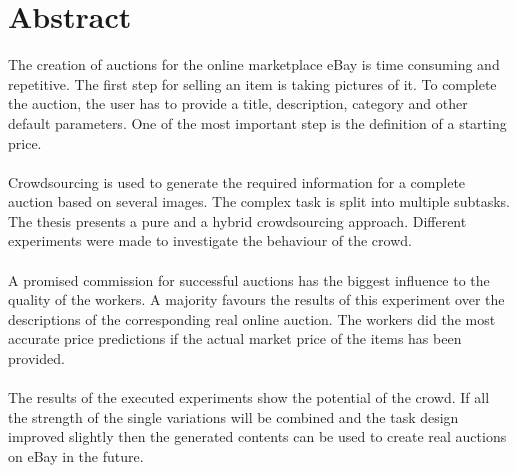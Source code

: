 \chapter*{Abstract}
\thispagestyle{empty}
The creation of auctions for the online marketplace eBay is time consuming and repetitive. The first step for selling an item is taking pictures of it. To complete the auction, the user has to provide a title, description, category and other default parameters. One of the most important step is the definition of a starting price.\\\\
Crowdsourcing is used to generate the required information for a complete auction based on several images. The complex task is split into multiple subtasks. The thesis presents a pure and a hybrid crowdsourcing approach. Different experiments were made to investigate the behaviour of the crowd.\\\\
A promised commission for successful auctions has the biggest influence to the quality of the workers. A majority favours the results of this experiment over the descriptions of the corresponding real online auction. The workers did the most accurate price predictions if the actual market price of the items has been provided.\\\\  
The results of the executed experiments show the potential of the crowd. If all the strength of the single variations will be combined and the task design improved slightly then the generated contents can be used to create real auctions on eBay in the future.
\clearpage
